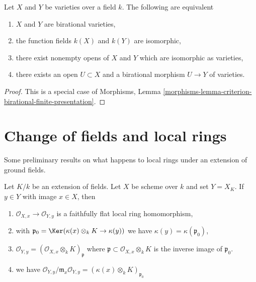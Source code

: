 \begin{lemma}
\label{lemma-birational-varieties}
Let $X$ and $Y$ be varieties over a field $k$.
The following are equivalent
\begin{enumerate}
\item $X$ and $Y$ are birational varieties,
\item the function fields $k(X)$ and $k(Y)$ are isomorphic,
\item there exist nonempty opens of $X$ and $Y$ which are isomorphic
as varieties,
\item there exists an open $U \subset X$ and a birational morphism
$U \to Y$ of varieties.
\end{enumerate}
\end{lemma}

\begin{proof}
This is a special case of
Morphisms, Lemma \ref{morphisms-lemma-criterion-birational-finite-presentation}.
\end{proof}







\section{Change of fields and local rings}
\label{section-local-rings}

\noindent
Some preliminary results on what happens to local rings under
an extension of ground fields.

\begin{lemma}
\label{lemma-change-fields-flat}
Let $K/k$ be an extension of fields. Let $X$ be scheme over $k$
and set $Y = X_K$. If $y \in Y$ with image $x \in X$, then
\begin{enumerate}
\item $\mathcal{O}_{X, x} \to \mathcal{O}_{Y, y}$ is a
faithfully flat local ring homomorphism,
\item with $\mathfrak p_0 = \Ker(\kappa(x) \otimes_k K \to \kappa(y))$
we have $\kappa(y) = \kappa(\mathfrak p_0)$,
\item $\mathcal{O}_{Y, y} = (\mathcal{O}_{X, x} \otimes_k K)_\mathfrak p$
where $\mathfrak p \subset \mathcal{O}_{X, x} \otimes_k K$ is the inverse
image of $\mathfrak p_0$.
\item we have
$\mathcal{O}_{Y, y}/\mathfrak m_x\mathcal{O}_{Y, y} =
(\kappa(x) \otimes_k K)_{\mathfrak p_0}$
\end{enumerate}
\end{lemma}

